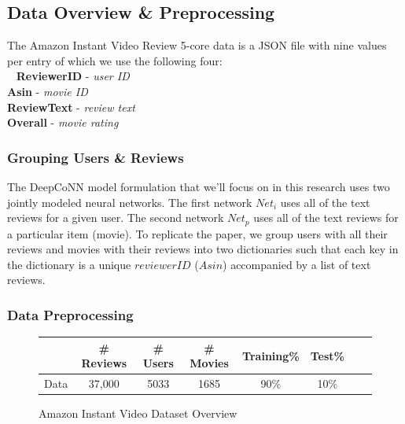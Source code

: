 \documentclass[10pt, twocolumn, letterpaper]{article}
\begin{document}
\subsection{Data Overview \& Preprocessing}
The Amazon Instant Video Review 5-core data is a JSON file with nine values per entry of which we use the following four:\\
\ \newline
 \hspace*{10mm}  \textbf{ReviewerID} - \textit{user ID} \\
 \hspace*{10mm}  \textbf{Asin} - \textit{movie ID} \\
 \hspace*{10mm}  \textbf{ReviewText} - \textit{review text} \\
 \hspace*{10mm}  \textbf{Overall} - \textit{movie rating}

\subsubsection{Grouping Users \& Reviews}
The DeepCoNN model formulation that we'll focus on in this research uses two jointly modeled neural networks. The first network $Net_{i}$ uses all of the text reviews for a given user. The second network $Net_{p}$ uses all of the text reviews for a particular item (movie). To replicate the paper, we group users with all their reviews and movies with their reviews into two dictionaries such that each key in the dictionary is a unique $reviewerID$ ($Asin$) accompanied by a list of text reviews.

\subsubsection{Data Preprocessing}
\begin{figure}[!ht]
\begin{center}
{\small
\begin{tabular}{l|ccccccc}
\hline
 & \# Reviews & \# Users & \# Movies & Training\% & Test\% \\
\hline
Data & 37,000  & 5033 & 1685 & 90\% & 10\%  \\
\hline
\end{tabular}
}
\end{center}
\caption{Amazon Instant Video Dataset Overview}
\end{figure}
\end{document}
